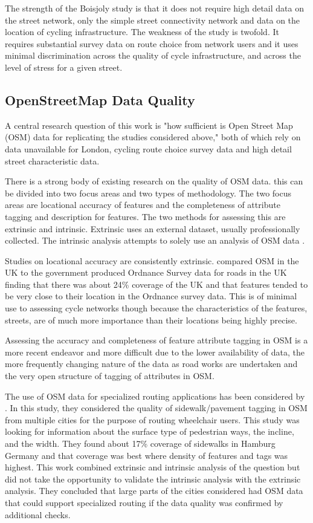 The strength of the Boisjoly study is that it does not require high detail data on the street network, only the simple street connectivity network and data on the location of cycling infrastructure. The weakness of the study is twofold. It requires substantial survey data on route choice from network users and it uses minimal discrimination across the quality of cycle infrastructure, and across the level of stress for a given street. 

\subsection{OpenStreetMap Data Quality}\label{OSMQuality}

A central research question of this work is "how sufficient is Open Street Map (OSM) data for replicating the studies considered above," both of which rely on data unavailable for London, cycling route choice survey data and high detail street characteristic data. 

There is a strong body of existing research on the quality of OSM data. this can be divided into two focus areas and two types of methodology. The two focus areas are locational accuracy of features and the completeness of attribute tagging and description for features. The two methods for assessing this are extrinsic and intrinsic. Extrinsic uses an external dataset, usually professionally collected. The intrinsic analysis attempts to solely use an analysis of OSM data . 

Studies on locational accuracy are consistently extrinsic. \textcite{haklay2010good} compared OSM in the UK to the government produced Ordnance Survey data for roads in the UK finding that there was about 24\% coverage of the UK and that features tended to be very close to their location in the Ordnance survey data. This is of minimal use to assessing cycle networks though because the characteristics of the features, streets, are of much more importance than their locations being highly precise. 

Assessing the accuracy and completeness of feature attribute tagging in OSM is a more recent endeavor and more difficult due to the lower availability of data, the more frequently changing nature of the data as road works are undertaken and the very open structure of tagging of attributes in OSM.  

The use of OSM data for specialized routing applications has been considered by \textcite{mobasheri2017crowdsourced}. In this study, they considered the quality of sidewalk/pavement tagging in OSM from multiple cities for the purpose of routing wheelchair users. This study was looking for information about the surface type of pedestrian ways, the incline, and the width. They found about 17\% coverage of sidewalks in Hamburg Germany and that coverage was best where density of features and tags was highest. This work combined extrinsic and intrinsic analysis of the question but did not take the opportunity to validate the intrinsic analysis with the extrinsic analysis. They concluded that large parts of the cities considered had OSM data that could support specialized routing if the data quality was confirmed by additional checks. 

